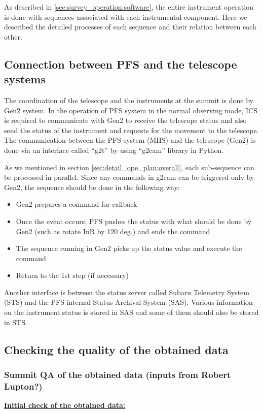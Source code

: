 \documentclass[a4paper]{article}
\begin{document}
As described in \ref{sec:survey_operation:software}, the entire instrument operation is done with sequences associated with each instrumental component. Here we described the detailed processes of each sequence and their relation between each other.

\subsection{Connection between PFS and the telescope systems}
The coordination of the telescope and the instruments at the summit is done by Gen2 system. In the operation of PFS system in the normal observing mode, ICS is required to communicate with Gen2 to receive the telescope status and also send the status of the instrument and requests for the movement to the telescope. The communication between the PFS system (MHS) and the telescope (Gen2) is done via an interface called ``g2t'' by using ``g2cam'' library in Python.

As we mentioned in section \ref{sec:detail_ope_plan:overall}, each sub-sequence can be processed in parallel. Since any commands in g2cam can be triggered only by Gen2, the sequence should be done in the following way:
\begin{itemize}
\item Gen2 prepares a command for callback
\item Once the event occurs, PFS pushes the status with what should be done by Gen2 (such as rotate InR by 120 deg.) and ends the command
\item The sequence running in Gen2 picks up the status value and execute the command
\item Return to the 1st step (if necessary)
\end{itemize}

Another interface is between the status server called Subaru Telemetry System (STS) and the PFS internal Status Archival System (SAS). Various information on the instrument status is stored in SAS and some of them should also be stored in STS.

\subsection{Checking the quality of the obtained data}
\subsubsection{Summit QA of the obtained data (inputs from Robert Lupton?)}
\noindent \underline{\textbf{Initial check of the obtained data:}}
\vspace{5pt}
\end{document}

